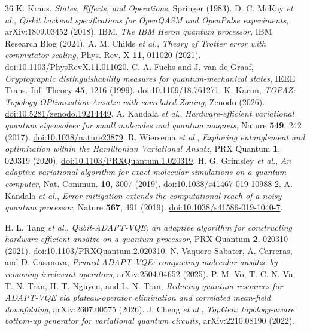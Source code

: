 \documentclass[twocolumn,aps,prl,superscriptaddress,showkeys]{revtex4-2}
\theoremstyle{plain}
\theoremstyle{definition}
\begin{document}
\begin{thebibliography}{36}
 K. Kraus, \textit{States, Effects, and Operations}, Springer (1983).
 D. C. McKay \textit{et al.}, \textit{Qiskit backend specifications for OpenQASM and OpenPulse experiments}, arXiv:1809.03452 (2018).
 IBM, \textit{The IBM Heron quantum processor}, IBM Research Blog (2024).
 A. M. Childs \textit{et al.}, \textit{Theory of Trotter error with commutator scaling}, Phys. Rev. X \textbf{11}, 011020 (2021). \href{https://doi.org/10.1103/PhysRevX.11.011020}{doi:10.1103/PhysRevX.11.011020}.
 C. A. Fuchs and J. van de Graaf, \textit{Cryptographic distinguishability measures for quantum-mechanical states}, IEEE Trans. Inf. Theory \textbf{45}, 1216 (1999). \href{https://doi.org/10.1109/18.761271}{doi:10.1109/18.761271}.
 K. Karun, \textit{TOPAZ: Topology OPtimization Ansatze with correlated Zoning}, Zenodo (2026). \href{https://doi.org/10.5281/zenodo.19214449}{doi:10.5281/zenodo.19214449}.
 A. Kandala \textit{et al.}, \textit{Hardware-efficient variational quantum eigensolver for small molecules and quantum magnets}, Nature \textbf{549}, 242 (2017). \href{https://doi.org/10.1038/nature23879}{doi:10.1038/nature23879}.
 R. Wiersema \textit{et al.}, \textit{Exploring entanglement and optimization within the Hamiltonian Variational Ansatz}, PRX Quantum \textbf{1}, 020319 (2020). \href{https://doi.org/10.1103/PRXQuantum.1.020319}{doi:10.1103/PRXQuantum.1.020319}.
 H. G. Grimsley \textit{et al.}, \textit{An adaptive variational algorithm for exact molecular simulations on a quantum computer}, Nat. Commun. \textbf{10}, 3007 (2019). \href{https://doi.org/10.1038/s41467-019-10988-2}{doi:10.1038/s41467-019-10988-2}.
 A. Kandala \textit{et al.}, \textit{Error mitigation extends the computational reach of a noisy quantum processor}, Nature \textbf{567}, 491 (2019). \href{https://doi.org/10.1038/s41586-019-1040-7}{doi:10.1038/s41586-019-1040-7}.

 H. L. Tang \textit{et al.}, \textit{Qubit-ADAPT-VQE: an adaptive algorithm for constructing hardware-efficient ans\"atze on a quantum processor}, PRX Quantum \textbf{2}, 020310 (2021). \href{https://doi.org/10.1103/PRXQuantum.2.020310}{doi:10.1103/PRXQuantum.2.020310}.
 N. Vaquero-Sabater, A. Carreras, and D. Casanova, \textit{Pruned-ADAPT-VQE: compacting molecular ans\"atze by removing irrelevant operators}, arXiv:2504.04652 (2025).
 P. M. Vo, T. C. N. Vu, T. N. Tran, H. T. Nguyen, and L. N. Tran, \textit{Reducing quantum resources for ADAPT-VQE via plateau-operator elimination and correlated mean-field downfolding}, arXiv:2607.00575 (2026).
 J. Cheng \textit{et al.}, \textit{TopGen: topology-aware bottom-up generator for variational quantum circuits}, arXiv:2210.08190 (2022).

\end{thebibliography}
\end{document}
